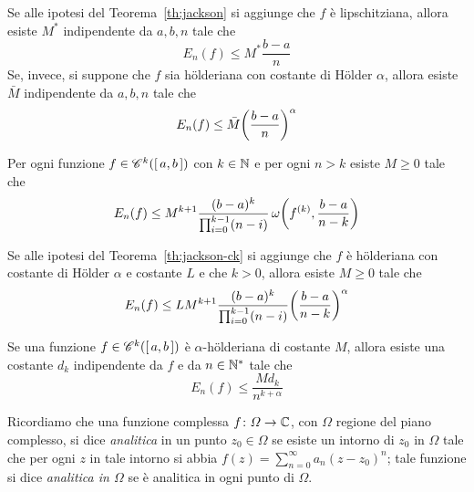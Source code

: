	\begin{corollario}\label{cor:jackson-lip-hold}
		Se alle ipotesi del Teorema~\ref{th:jackson} si aggiunge che \(f\) è lipschitziana, allora esiste \(M^*\) indipendente da \(a, b, n\) tale che
		\begin{equation}\label{eq:jackson-lip}
			E_n (f) \le M^* \frac{b - a}{n}
		\end{equation}
		Se, invece, si suppone che \(f\) sia h\"olderiana con costante di H\"older \(\alpha\), allora esiste \(\bar{M}\) indipendente da \(a, b, n\) tale che
		\begin{equation}\label{eq:jackson-hold}
			E_n (f) \le \bar{M} \qty(\frac{b - a}{n})^\alpha
		\end{equation}
	\end{corollario}

	\begin{teorema}[Jackson]\label{th:jackson-ck}
		Per ogni funzione \(f \in \mathscr{C}^k ([\, a, b \,])\) con \(k \in \mathbb{N}\) e per ogni \(n > k\) esiste \(M \ge 0\) tale che
		\begin{equation}\label{eq:jackson-ck}
			E_n (f) \le M^{k + 1} \frac{(b - a)^k}{\prod_{i = 0}^{k - 1} (n - i)} \, \omega \qty(f^{(k)}, \frac{b - a}{n - k})
		\end{equation}
	\end{teorema}

	\begin{corollario}\label{cor:jackson-ck-hold}
		Se alle ipotesi del Teorema~\ref{th:jackson-ck} si aggiunge che \(f\) è h\"olderiana con costante di H\"older \(\alpha\) e costante \(L\) e che \(k > 0\), allora esiste \(M \ge 0\) tale che
		\begin{equation}\label{eq:jackson-ck-hold}
			E_n (f) \le L M^{k + 1} \frac{(b - a)^k}{\prod_{i = 0}^{k - 1} (n - i)} \qty(\frac{b - a}{n - k})^\alpha
		\end{equation}
	\end{corollario}

	\begin{teorema}[Jackson]\label{th:jackson-hold-d}
		Se una funzione \(f \in \mathscr{C}^k ([\, a, b \,])\) è \(\alpha\)-h\"olderiana di costante \(M\), allora esiste una costante \(d_k\) indipendente da \(f\) e da \(n \in \mathbb{N}^*\) tale che
		\begin{equation}\label{eq:jackson-hold-d}
			E_n (f) \le \frac{M d_k}{n^{k + \alpha}}
		\end{equation}
	\end{teorema}

	Ricordiamo che una funzione complessa \(f \colon \varOmega \to \mathbb{C}\), con \(\varOmega\) regione del piano complesso, si dice \emph{analitica} in un punto \(z_0 \in \varOmega\) se esiste un intorno di \(z_0\) in \(\varOmega\) tale che per ogni \(z\) in tale intorno si abbia \(f (z) = \sum_{n = 0}^\infty a_n (z - z_0)^n\); tale funzione si dice \emph{analitica in \(\varOmega\)} se è analitica in ogni punto di \(\varOmega\).
	
